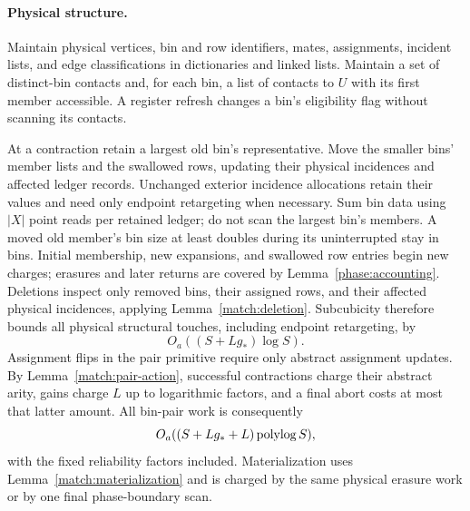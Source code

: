 \paragraph{Physical structure.}
Maintain physical vertices, bin and row identifiers, mates,
assignments, incident lists, and edge classifications in
dictionaries and linked lists.  Maintain a set of distinct-bin
contacts and, for each bin, a list of contacts to \(U\) with
its first member accessible.  A register refresh changes a
bin's eligibility flag without scanning its contacts.

At a contraction retain a largest old bin's representative.
Move the smaller bins' member lists and the swallowed rows,
updating their physical incidences and affected ledger
records.  Unchanged exterior incidence allocations retain
their values and need only endpoint retargeting when
necessary.  Sum bin data using \(|X|\) point reads per
retained ledger; do not scan the largest bin's members.
A moved old member's bin size at least doubles during its
uninterrupted stay in bins.  Initial membership, new
expansions, and swallowed row entries begin new charges;
erasures and later returns are covered by
Lemma~\ref{phase:accounting}.  Deletions inspect only removed
bins, their assigned rows, and their affected physical
incidences, applying Lemma~\ref{match:deletion}.
Subcubicity therefore bounds all physical structural touches,
including endpoint retargeting, by
\begin{equation}
\label{phase:structural-touches}
                         O_a((S+Lg_*)\log S).
\end{equation}
Assignment flips in the pair primitive require only abstract
assignment updates.  By Lemma~\ref{match:pair-action}, successful
contractions charge their abstract arity, gains charge \(L\)
up to logarithmic factors, and a final abort costs at most
that latter amount.  All bin-pair work is consequently
\begin{equation}
\label{phase:pair-work}
                    O_a((S+Lg_*+L)\operatorname{polylog} S),
\end{equation}
with the fixed reliability factors included.  Materialization
uses Lemma~\ref{match:materialization} and is charged by the same
physical erasure work or by one final phase-boundary scan.

